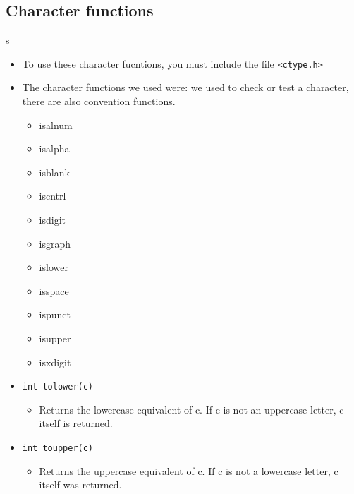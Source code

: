 \subsection{Character functions}s
\begin{itemize}
    \item To use these character fucntions, you must include the file \verb|<ctype.h>|
    \item The character functions we used were: we used to check or test a character, there are also convention functions.
        \begin{itemize}
            \item isalnum
            \item isalpha
            \item isblank
            \item iscntrl
            \item isdigit
            \item isgraph
            \item islower
            \item isspace
            \item ispunct
            \item isupper
            \item isxdigit
        \end{itemize}
    
    \item \texttt{int tolower(c)}
        \begin{itemize}
            \item Returns the lowercase equivalent of c. If c is not an uppercase letter, c itself is returned.
        \end{itemize}
    
    \item \texttt{int toupper(c)}
        \begin{itemize}
            \item Returns the uppercase equivalent of c. If c is not a lowercase letter, c itself was returned.
        \end{itemize}
\end{itemize}

